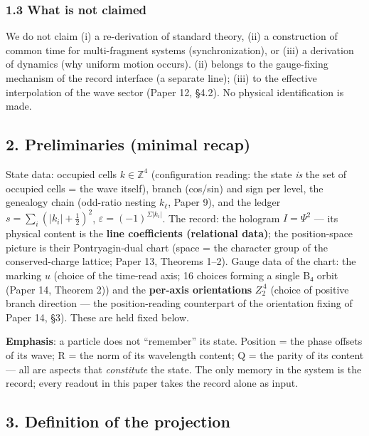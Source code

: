 \documentclass[
]{article}
\begin{document}
\subsubsection{1.3 What is not claimed}\label{what-is-not-claimed}

We do not claim (i) a re-derivation of standard theory, (ii) a
construction of common time for multi-fragment systems
(synchronization), or (iii) a derivation of dynamics (why uniform motion
occurs). (ii) belongs to the gauge-fixing mechanism of the record
interface (a separate line); (iii) to the effective interpolation of the
wave sector (Paper 12, §4.2). No physical identification is made.

\subsection{2. Preliminaries (minimal
recap)}\label{preliminaries-minimal-recap}

State data: occupied cells \(k\in\mathbb{Z}^4\) (configuration reading:
the state \emph{is} the set of occupied cells = the wave itself), branch
(cos/sin) and sign per level, the genealogy chain (odd-ratio nesting
\(k_\ell\), Paper 9), and the ledger \(s=\sum_i(|k_i|+\tfrac12)^2\),
\(\varepsilon=(-1)^{\Sigma|k_i|}\). The record: the hologram
\(I=\Psi^2\) --- its physical content is the \textbf{line coefficients
(relational data)}; the position-space picture is their Pontryagin-dual
chart (space = the character group of the conserved-charge lattice;
Paper 13, Theorems 1--2). Gauge data of the chart: the marking \(u\)
(choice of the time-read axis; 16 choices forming a single B₄ orbit
(Paper 14, Theorem 2)) and the \textbf{per-axis orientations}
\(Z_2^{\,4}\) (choice of positive branch direction --- the
position-reading counterpart of the orientation fixing of Paper 14, §3).
These are held fixed below.

\textbf{Emphasis}: a particle does not ``remember'' its state. Position
= the phase offsets of its wave; R = the norm of its wavelength content;
Q = the parity of its content --- all are aspects that \emph{constitute}
the state. The only memory in the system is the record; every readout in
this paper takes the record alone as input.

\subsection{3. Definition of the
projection}\label{definition-of-the-projection}
\end{document}
